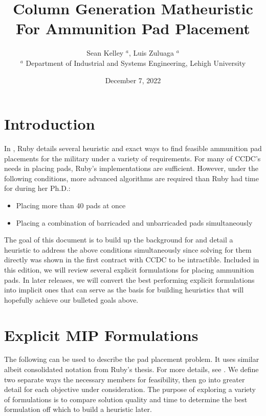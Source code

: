\documentclass[10pt]{article}
\begin{document}
	\title{Column Generation Matheuristic For Ammunition Pad Placement}
	\author{Sean Kelley $^a$, Luis Zuluaga $ ^a $ \\
		$^a$ Department of Industrial and Systems Engineering, Lehigh University}
	\date{December 7, 2022}
	\maketitle

	\section{Introduction}
	In \cite{ruby}, Ruby details several heuristic and exact ways to find feasible ammunition pad placements for the military under a variety of requirements. For many of CCDC's needs in placing pads, Ruby's implementations are sufficient. However, under the following conditions, more advanced algorithms are required than Ruby had time for during her Ph.D.:
	\begin{itemize}
		\item Placing more than 40 pads at once
		\item Placing a combination of barricaded and unbarricaded pads simultaneously
	\end{itemize}
	The goal of this document is to build up the background for and detail a heuristic to address the above conditions simultaneously since solving for them directly was shown in the first contract with CCDC to be intractible. Included in this edition, we will review several explicit formulations for placing ammunition pads. In later releases, we will convert the best performing explicit formulations into implicit ones that can serve as the basis for building heuristics that will hopefully achieve our bulleted goals above.
	
	\section{Explicit MIP Formulations}
	The following can be used to describe the pad placement problem. It uses similar albeit consolidated notation from Ruby's thesis. For more details, see \cite{ruby}. We define two separate ways the necessary members for feasibility, then go into greater detail for each objective under consideration. The purpose of exploring a variety of formulations is to compare solution quality and time to determine the best formulation off which to build a heuristic later.
	
\end{document}
